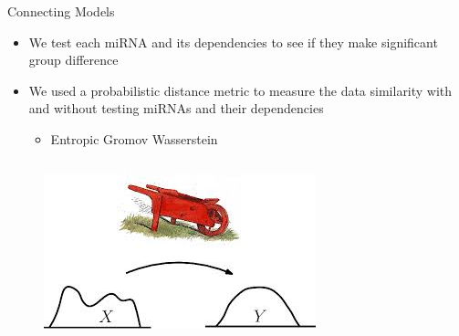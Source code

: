 \documentclass{beamer}
\begin{document}
\begin{frame}{Connecting Models}
	\begin{itemize}
		\item We test each miRNA and its dependencies to see if they make significant group difference
		\item We used a probabilistic distance metric to measure the data similarity with and without testing miRNAs and their dependencies
		      \begin{itemize}
			      \item Entropic Gromov Wasserstein
		      \end{itemize}
	\end{itemize}
	\begin{columns}
		\begin{column}{.48\textwidth}
			\begin{figure}[ht]
				\centering
				\includegraphics[width=0.7\textheight]{figures/earth-mover-distance.jpeg}
				\caption*{\label{fig:emd}}
			\end{figure}
		\end{column}
		\begin{column}{.48\textwidth}
			\begin{figure}[ht]
				\centering
				\scalebox{0.7}{}
				\caption*{\label{fig:connect-networks}}
			\end{figure}
		\end{column}
	\end{columns}
\end{frame}
\end{document}
